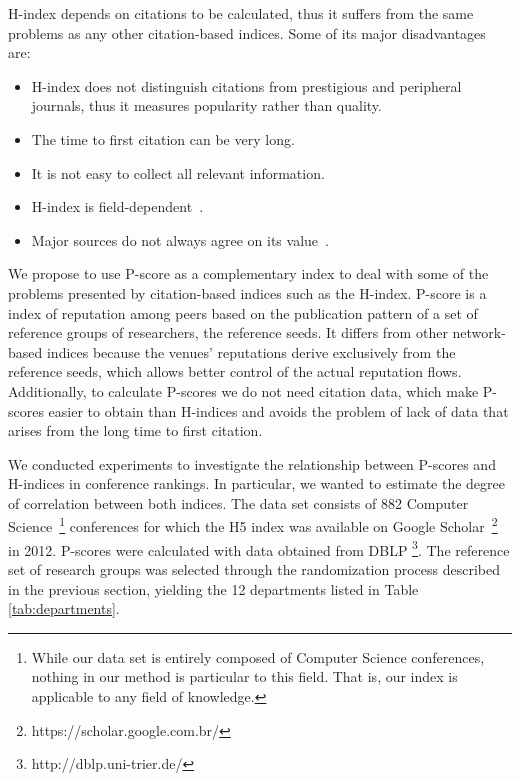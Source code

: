 \documentclass[notitlepage]{svjour3}
\begin{document}
H-index depends on citations to be calculated, thus it suffers from the 
same problems as any other citation-based indices. Some of its major disadvantages are:

\begin{itemize}
\item H-index does not distinguish citations from prestigious and peripheral journals, thus 
it measures popularity rather than quality.
\item The time to first citation can be very long.
\item It is not easy to collect all relevant information.
\item H-index is field-dependent~\cite{Wendl2007}.
\item Major sources do not always agree on its value~\cite{Bar-Ilan2008}. 
\end{itemize}

We propose to use P-score as a complementary index to deal with some of the problems
presented by citation-based indices such as the H-index.
P-score is a index of reputation among peers based on the publication pattern of a set of
reference groups of researchers, the reference seeds. It differs from other network-based 
indices because the venues' reputations derive exclusively from the reference seeds, which 
allows better control of the actual reputation flows. Additionally, to calculate P-scores we 
do not need citation data, which make P-scores easier to obtain than H-indices and avoids 
the problem of lack of data that arises from the long time to first citation.

We conducted experiments to investigate the relationship between P-scores and H-indices
in conference rankings. In particular, we wanted to estimate the degree of correlation between both 
indices. The data set consists of 882 
Computer Science~\footnote{
While our data set is entirely composed of Computer Science conferences, nothing in our method is
particular to this field. That is, our index is applicable to any field of knowledge.
} 
conferences
for which the H5 index was available on Google Scholar~\footnote{https://scholar.google.com.br/}
in 2012. P-scores were calculated with
data obtained from DBLP \footnote{http://dblp.uni-trier.de/}. The reference set of research groups
was selected through the randomization process described in the previous section, 
yielding the 12 departments listed in Table \ref{tab:departments}.
\end{document}
